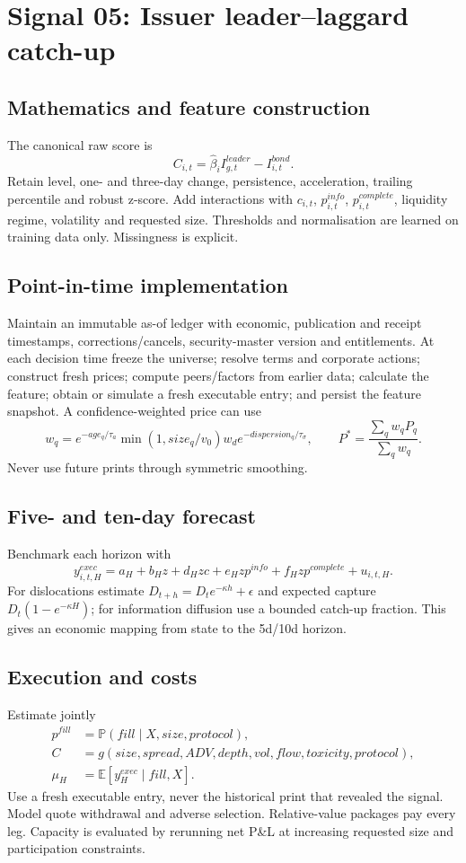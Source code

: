 \documentclass[10pt]{article}
\newcommand{\E}{\mathbb{E}}\newcommand{\Pp}{\mathbb{P}}
\begin{document}
\section{Signal 05: Issuer leader--laggard catch-up}
\subsection{Mathematics and feature construction}
The canonical raw score is
\begin{equation}C_{i,t}=\widehat\beta_i I^{leader}_{g,t}-I^{bond}_{i,t}.\end{equation}
Retain level, one- and three-day change, persistence, acceleration, trailing percentile and robust z-score. Add interactions with $c_{i,t}$, $p^{info}_{i,t}$, $p^{complete}_{i,t}$, liquidity regime, volatility and requested size. Thresholds and normalisation are learned on training data only. Missingness is explicit.

\subsection{Point-in-time implementation}
Maintain an immutable as-of ledger with economic, publication and receipt timestamps, corrections/cancels, security-master version and entitlements. At each decision time freeze the universe; resolve terms and corporate actions; construct fresh prices; compute peers/factors from earlier data; calculate the feature; obtain or simulate a fresh executable entry; and persist the feature snapshot. A confidence-weighted price can use
\[w_q=e^{-age_q/\tau_a}\min(1,size_q/v_0)w_d e^{-dispersion_q/\tau_\sigma},\qquad P^*=\frac{\sum_qw_qP_q}{\sum_qw_q}.\]
Never use future prints through symmetric smoothing.

\subsection{Five- and ten-day forecast}
Benchmark each horizon with
\[y^{exec}_{i,t,H}=a_H+b_Hz+d_Hzc+e_Hzp^{info}+f_Hzp^{complete}+u_{i,t,H}.\]
For dislocations estimate $D_{t+h}=D_te^{-\kappa h}+\epsilon$ and expected capture $D_t(1-e^{-\kappa H})$; for information diffusion use a bounded catch-up fraction. This gives an economic mapping from state to the 5d/10d horizon.

\subsection{Execution and costs}
Estimate jointly
\begin{align}
p^{fill}&=\Pp(fill\mid X,size,protocol),\\
C&=g(size,spread,ADV,depth,vol,flow,toxicity,protocol),\\
\mu_H&=\E[y^{exec}_H\mid fill,X].
\end{align}
Use a fresh executable entry, never the historical print that revealed the signal. Model quote withdrawal and adverse selection. Relative-value packages pay every leg. Capacity is evaluated by rerunning net P\&L at increasing requested size and participation constraints.
\end{document}
